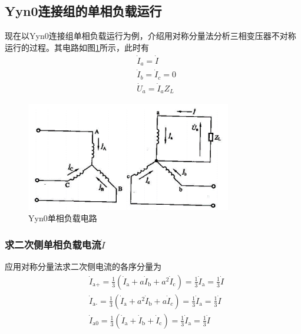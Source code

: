 \documentclass{book}
\begin{document}
\subsection{Yyn0连接组的单相负载运行}

现在以Yyn0连接组单相负载运行为例，介绍用对称分量法分析三相变压器不对称运行的过程。其电路如图\ref{fig_4.21}所示，此时有
\begin{align}
& {{{\dot{I}}}_{a}}=\dot{I} \\ 
& {{{\dot{I}}}_{b}}={{{\dot{I}}}_{c}}=0 \\ 
& {{{\dot{U}}}_{a}}={{{\dot{I}}}_{a}}{{Z}_{L}}
\label{4-18}
\end{align}

\begin{figure}[H]
	\centering
	\includegraphics[width=0.80\textwidth]{4-21.png}
	\caption{Yyn0单相负载电路}
	\label{fig_4.21}
\end{figure}

\subsubsection{求二次侧单相负载电流$\dot{I}$}
应用对称分量法求二次侧电流的各序分量为
\begin{align}
& {{{\dot{I}}}_{\text{a+}}}=\frac{1}{3}\left( {{{\dot{I}}}_{\text{a}}}+a{{{\dot{I}}}_{\text{b}}}+{{a}^{2}}{{{\dot{I}}}_{\text{c}}} \right)=\frac{1}{3}{{{\dot{I}}}_{\text{a}}}=\frac{1}{3}\dot{I} \\ 
& {{{\dot{I}}}_{\text{a-}}}=\frac{1}{3}\left( {{{\dot{I}}}_{\text{a}}}+{{a}^{2}}{{{\dot{I}}}_{\text{b}}}+a{{{\dot{I}}}_{c}} \right)=\frac{1}{3}{{{\dot{I}}}_{\text{a}}}=\frac{1}{3}\dot{I} \\ 
& {{{\dot{I}}}_{\text{a0}}}=\frac{1}{3}\left( {{{\dot{I}}}_{\text{a}}}+{{{\dot{I}}}_{\text{b}}}+{{{\dot{I}}}_{\text{c}}} \right)=\frac{1}{3}{{{\dot{I}}}_{\text{a}}}=\frac{1}{3}\dot{I} 
\label{4-19}
\end{align}
\end{document}
